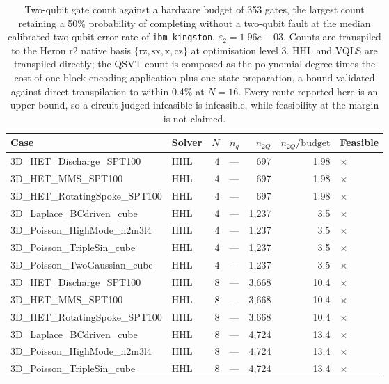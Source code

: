 \begin{table}[htbp]
  \centering
  \caption{Two-qubit gate count against a hardware budget of 353 gates, the largest count retaining a 50\% probability of completing without a two-qubit fault at the median calibrated two-qubit error rate of \texttt{ibm\_kingston}, $\varepsilon_2 = 1.96e-03$. Counts are transpiled to the Heron r2 native basis $\{\mathrm{rz}, \mathrm{sx}, \mathrm{x}, \mathrm{cz}\}$ at optimisation level 3. HHL and VQLS are transpiled directly; the QSVT count is composed as the polynomial degree times the cost of one block-encoding application plus one state preparation, a bound validated against direct transpilation to within 0.4\% at $N=16$. Every route reported here is an upper bound, so a circuit judged infeasible is infeasible, while feasibility at the margin is not claimed.}
  \label{tab:hardware_feasibility}
  \begin{tabular}{llrrrrl}
    \toprule
    Case & Solver & $N$ & $n_q$ & $n_{2Q}$ & $n_{2Q}/\mathrm{budget}$ & Feasible \\
    \midrule
    3D\_HET\_Discharge\_SPT100 & HHL & 4 & --- & 697 & 1.98 & $\times$ \\
    3D\_HET\_MMS\_SPT100 & HHL & 4 & --- & 697 & 1.98 & $\times$ \\
    3D\_HET\_RotatingSpoke\_SPT100 & HHL & 4 & --- & 697 & 1.98 & $\times$ \\
    3D\_Laplace\_BCdriven\_cube & HHL & 4 & --- & 1,237 & 3.5 & $\times$ \\
    3D\_Poisson\_HighMode\_n2m3l4 & HHL & 4 & --- & 1,237 & 3.5 & $\times$ \\
    3D\_Poisson\_TripleSin\_cube & HHL & 4 & --- & 1,237 & 3.5 & $\times$ \\
    3D\_Poisson\_TwoGaussian\_cube & HHL & 4 & --- & 1,237 & 3.5 & $\times$ \\
    3D\_HET\_Discharge\_SPT100 & HHL & 8 & --- & 3,668 & 10.4 & $\times$ \\
    3D\_HET\_MMS\_SPT100 & HHL & 8 & --- & 3,668 & 10.4 & $\times$ \\
    3D\_HET\_RotatingSpoke\_SPT100 & HHL & 8 & --- & 3,668 & 10.4 & $\times$ \\
    3D\_Laplace\_BCdriven\_cube & HHL & 8 & --- & 4,724 & 13.4 & $\times$ \\
    3D\_Poisson\_HighMode\_n2m3l4 & HHL & 8 & --- & 4,724 & 13.4 & $\times$ \\
    3D\_Poisson\_TripleSin\_cube & HHL & 8 & --- & 4,724 & 13.4 & $\times$ \\

\end{tabular}
\end{table}

